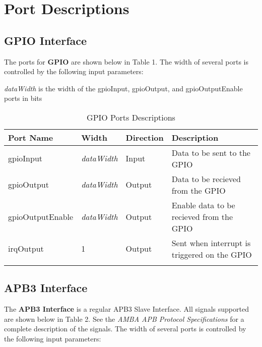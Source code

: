 \section{Port Descriptions}

\subsection{GPIO Interface}

The ports for \textbf{GPIO} are shown below in 
Table 1. The width of several ports is controlled 
by the following input parameters:

\textit{dataWidth} is the width of the gpioInput, gpioOutput, and gpioOutputEnable ports in bits
 
\renewcommand*{\arraystretch}{1.4}
\begin{longtable}[H]{
  | p{}
  | p{}
  | p{}
  | p{} |
  }
  \hline
  \textbf{Port Name} &   
  \textbf{Width} &   
  \textbf{Direction} &   
  \textbf{Description} \\ \hline \hline

  gpioInput &       
  \textit{dataWidth} & 
  Input &       
  Data to be sent to the GPIO\\ \hline

  gpioOutput &        
  \textit{dataWidth} & 
  Output &       
  Data to be recieved from the GPIO \\ \hline

  gpioOutputEnable &      
  \textit{dataWidth} & 
  Output &     
  Enable data to be recieved from the GPIO \\ \hline

  irqOutput &      
  1 & 
  Output &     
  Sent when interrupt is triggered on the GPIO \\ \hline
 
 
  \caption{GPIO Ports Descriptions}\label{table:ports}
\end{longtable}

\subsection{APB3 Interface}
The \textbf{APB3 Interface} is a regular APB3 Slave Interface. All signals supported are shown below in 
Table 2. See the \textit{AMBA APB Protocol Specifications} for a complete description of the signals. The width of several ports is controlled 
by the following input parameters:

